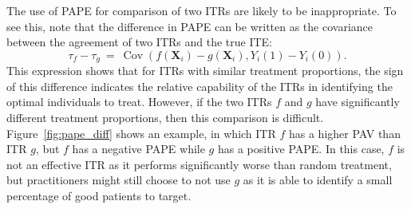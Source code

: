 \documentclass[USenglish,onecolumn]{article}
\DeclareMathOperator\Cov{Cov}
\newcommand\bX{\bm{X}}
\begin{document}
The use of PAPE for comparison of two ITRs are likely to be
inappropriate.  To see this, note that the difference in PAPE can be
written as the covariance between the agreement of two ITRs and the
true ITE:
\begin{equation*}
	\tau_f-\tau_g \ = \ \Cov(f(\bX_i)-g(\bX_i), Y_i(1)-Y_i(0)).
\end{equation*}
This expression shows that for ITRs with similar treatment
proportions, the sign of this difference indicates the relative
capability of the ITRs in identifying the optimal individuals to
treat. However, if the two ITRs $f$ and $g$ have significantly
different treatment proportions, then this comparison is difficult.
Figure~\ref{fig:pape_diff} shows an example, in which ITR $f$ has a
higher PAV than ITR $g$, but $f$ has a negative PAPE while $g$ has a
positive PAPE. In this case, $f$ is not an effective ITR as it
performs significantly worse than random treatment, but practitioners
might still choose to not use $g$ as it is able to identify a small
percentage of good patients to target.
\end{document}
